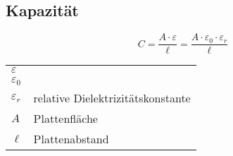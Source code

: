 



\subsection{Kapazität}
\[ C = \frac{A \cdot \varepsilon}{\ell} 
= \frac{A \cdot \varepsilon_0 \cdot \varepsilon_r}{\ell} \]
\begin{tabular}{lp{4.5cm}}
$\varepsilon$&\\
$\varepsilon_0$&\\
$\varepsilon_r$&relative Dielektrizitätskonstante\\
$A$&Plattenfläche\\
$\ell$&Plattenabstand
\end{tabular}